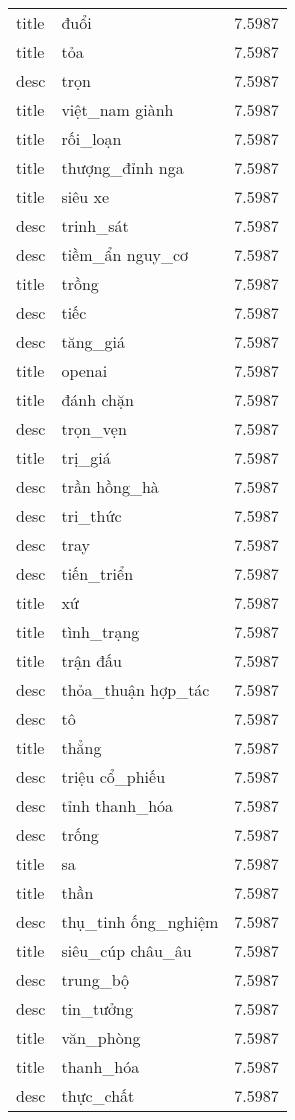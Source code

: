 \documentclass{article}
\begin{document}
\begin{tabular}{lll}
title & đuổi & 7.5987\\
title & tỏa & 7.5987\\
desc & trọn & 7.5987\\
title & việt\_nam giành & 7.5987\\
title & rối\_loạn & 7.5987\\
title & thượng\_đỉnh nga & 7.5987\\
title & siêu xe & 7.5987\\
desc & trinh\_sát & 7.5987\\
desc & tiềm\_ẩn nguy\_cơ & 7.5987\\
title & trồng & 7.5987\\
desc & tiếc & 7.5987\\
desc & tăng\_giá & 7.5987\\
title & openai & 7.5987\\
title & đánh chặn & 7.5987\\
desc & trọn\_vẹn & 7.5987\\
title & trị\_giá & 7.5987\\
desc & trần hồng\_hà & 7.5987\\
desc & tri\_thức & 7.5987\\
desc & tray & 7.5987\\
desc & tiến\_triển & 7.5987\\
title & xứ & 7.5987\\
title & tình\_trạng & 7.5987\\
title & trận đấu & 7.5987\\
desc & thỏa\_thuận hợp\_tác & 7.5987\\
desc & tô & 7.5987\\
title & thẳng & 7.5987\\
desc & triệu cổ\_phiếu & 7.5987\\
desc & tỉnh thanh\_hóa & 7.5987\\
desc & trống & 7.5987\\
title & sa & 7.5987\\
title & thần & 7.5987\\
desc & thụ\_tinh ống\_nghiệm & 7.5987\\
title & siêu\_cúp châu\_âu & 7.5987\\
desc & trung\_bộ & 7.5987\\
desc & tin\_tưởng & 7.5987\\
title & văn\_phòng & 7.5987\\
title & thanh\_hóa & 7.5987\\
desc & thực\_chất & 7.5987\\

\end{tabular}
\end{document}
